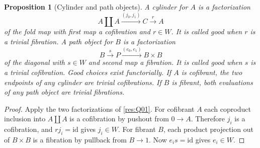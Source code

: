 \documentclass[11pt,oneside,openany]{book}
\newtheorem{proposition}[theorem]{Proposition}
\theoremstyle{definition}
\theoremstyle{remark}
\begin{document}
\begin{proposition}[Cylinder and path objects]\label{res:Q02}
A cylinder for \(A\) is a factorization
\[
 A\amalg A\xrightarrow{(j_0,j_1)} C\xrightarrow{r}A
\]
of the fold map with first map a cofibration and \(r\in W\).
It is called good when \(r\) is a trivial fibration.
A path object for \(B\) is a factorization
\[
 B\xrightarrow{s} P\xrightarrow{(e_0,e_1)}B\times B
\]
of the diagonal with \(s\in W\) and second map a fibration.
It is called good when \(s\) is a trivial cofibration.
Good choices exist functorially. If \(A\) is cofibrant, the
two endpoints of any cylinder are trivial cofibrations. If \(B\)
is fibrant, both evaluations of any path object are trivial
fibrations.
\end{proposition}
\begin{proof}
Apply the two factorizations of \ref{res:Q01}. For cofibrant \(A\)
each coproduct inclusion into \(A\amalg A\) is a cofibration by
pushout from \(0\to A\). Therefore \(j_i\) is a cofibration,
and \(rj_i=\mathrm{id}\) gives \(j_i\in W\). For fibrant \(B\),
each product projection out of \(B\times B\) is a fibration
by pullback from \(B\to1\). Now \(e_i s=\mathrm{id}\) gives
\(e_i\in W\).
\end{proof}
\end{document}
